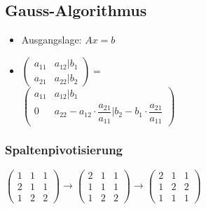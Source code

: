 \documentclass[8pt,a4paper]{scrartcl}
\begin{document}
\begin{multicols*}{3}
		\subsection{Gauss-Algorithmus}
			\begin{itemize}\itemsep0pt		
				\item Ausgangslage: $Ax = b$
				\item $\begin{pmatrix}a_{11}&a_{12} | b_{1}\\a_{21}&a_{22}|b_{2}\end{pmatrix} = $ \\ $\begin{pmatrix}a_{11}&a_{12} | b_{1}\\0&a_{22}-a_{12}\cdot \dfrac{a_{21}}{a_{11}}|b_{2}-b_{1}\cdot \dfrac{a_{21}}{a_{11}}\end{pmatrix} $
			\end{itemize}
			\subsubsection{Spaltenpivotisierung}
			$\begin{pmatrix}1&1&1\\2&1&1\\1&2&2\end{pmatrix} \rightarrow \begin{pmatrix}2&1&1\\1&1&1\\1&2&2\end{pmatrix} \rightarrow \begin{pmatrix}2&1&1\\1&2&2\\1&1&1\end{pmatrix}$
	

\end{multicols*}
\end{document}
